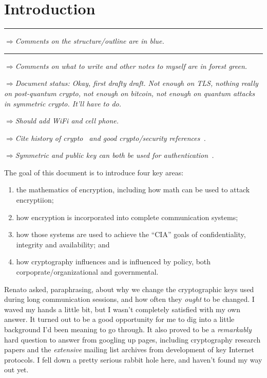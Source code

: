 \documentclass[%
 aip,
 jmp,%
 amsmath,amssymb,
 reprint,%
]{revtex4-1}
\def\outlinecomment#1{\hrule{\color{Blue}$\Rightarrow${\small\em #1}}\hrule}
\def\comment#1{{\color{ForestGreen}$\Rightarrow${\small\em #1}}}
\begin{document}
\section{Introduction}

\outlinecomment{Comments on the structure/outline are in blue.}

\comment{Comments on what to write and other notes to myself are in
  forest green.}

\comment{Document status:
Okay, first drafty draft.  Not enough on TLS,
nothing really on post-quantum crypto, not enough on bitcoin, not
enough on quantum attacks in symmetric crypto.  It'll have to do.}

\comment{Should add WiFi and cell phone.}

\comment{Cite history of
crypto~\cite{kahn1996codebreakers,singh1999code} and good  crypto/security references~\cite{schneier96:_applied_crypto,handbook,bishop2002art}.}

\comment{Symmetric and public key can both be used for
  authentication~\cite{needham:encrypt}.}

The goal of this document is to introduce four key areas:

\begin{enumerate}
\item the mathematics of encryption, including how math can be used to
  attack encryptiion;
\item how encryption is incorporated into complete communication
  systems;
\item how those systems are used to achieve the ``CIA'' goals of
  confidentiality, integrity and availability; and
\item how cryptography influences and is influenced by policy, both
  corpoprate/organizational and governmental.
\end{enumerate}

Renato asked, paraphrasing, about why we change the cryptographic keys
used during long communication sessions, and how often they \emph{ought} to
be changed.  I waved my hands a little bit, but I wasn't completely
satisfied with my own answer.  It turned out to be a good opportunity
for me to dig into a little background I'd been meaning to go through.
It also proved to be a \emph{remarkably} hard question to answer from
googling up pages, including cryptography research papers and the
\emph{extensive} mailing list archives from development of key Internet
protocols.  I fell down a pretty serious rabbit hole here, and haven't
found my way out yet.
\end{document}
